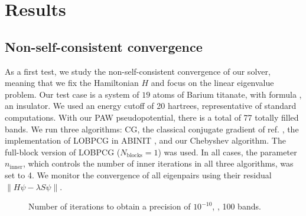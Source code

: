 \documentclass[11pt]{elsarticle}
\newcommand{\norm}[1]{\left\lVert#1\right\rVert}
\newcommand{\axisopt}{height = 10cm, width = 14cm}
\newcommand{\nline}{\ensuremath{n_{\text{inner}}}\xspace}
\newcommand{\nblocks}{\ensuremath{N_{\text{blocks}}}\xspace}
\newcommand{\chebmarker}{square}
\newcommand{\lobpcgmarker}{triangle}
\begin{document}
\section{Results}
\label{sec:numres}
\subsection{Non-self-consistent convergence}
As a first test, we study the non-self-consistent convergence of our solver,
meaning that we fix the Hamiltonian $H$ and focus on the linear
eigenvalue problem. Our test case is a system of $19$ atoms of Barium
titanate, with formula , an insulator. We used an energy
cutoff of 20 hartrees, representative of standard computations. With
our PAW pseudopotential, there is a total of 77 totally filled
bands. We run three algorithms: CG, the classical conjugate gradient
of ref. \cite{payne1992iterative, kresse1996efficient}, the implementation
of LOBPCG in ABINIT \cite{bottin2008large}, and our Chebyshev
algorithm. The full-block version of LOBPCG ($\nblocks = 1$) was
used. In all cases, the parameter \nline, which controls the number of
inner iterations in all three algorithms, was set to 4. We monitor the
convergence of all eigenpairs using their residual $\norm{H \psi -
  \lambda S \psi}$.


\begin{figure}[h!]
  \centering
  {
  }
  \caption{Number of iterations to obtain a precision of $10^{-10}$,
    , 100 bands.}
  \label{fig:cv_batio3_100bands}
\end{figure}
\end{document}
